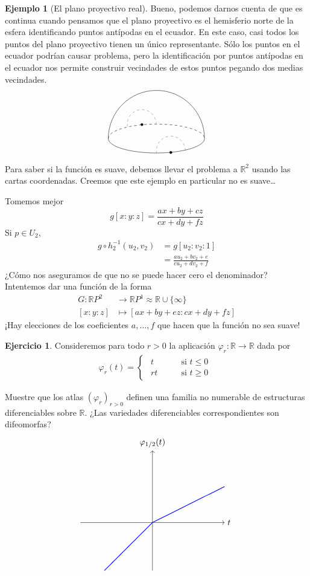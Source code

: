 \documentclass[spanish]{book}
\theoremstyle{definition}
\newtheorem*{ejer*}{Ejercicio}
\newtheorem*{ejem}{Ejemplo}
\newcommand{\R}{\mathbb{R}}
\begin{document}
\begin{ejem}[El plano proyectivo real]
		Bueno, podemos darnos cuenta de que es continua cuando pensamos que el plano proyectivo es el hemisferio norte de la esfera identificando puntos antípodas en el ecuador. En este caso, casi todos los puntos del plano proyectivo tienen un único representante. Sólo los puntos en el ecuador podrían causar problema, pero la identificación por puntos antípodas en el ecuador nos permite construir vecindades de estos puntos pegando dos medias vecindades.
		\[\begin{tikzpicture}[scale=2]
			\draw (-1,0) arc (180:0:1);
			\draw (-1,0) arc (180:360:1 and 0.3);
			\draw[dashed] (-1,0) arc (180:0:1 and 0.3);
			
			\filldraw (-.3,.29) circle (0.025);
			\filldraw (.3,-.29) circle (0.025);
			
			\draw[gray,dashed] (-.6,.25) arc (190:0:0.3);
			\draw[gray,dashed] (.6,-.25) arc (0:190:0.3);
		\end{tikzpicture}\]
		Para saber si la función es suave, debemos llevar el problema a $\R^2$ usando las cartas coordenadas. Creemos que este ejemplo en particular no es suave…
		
		Tomemos mejor
		\[g[x:y:z]=\frac{ax+by+cz}{cx+dy+fz}\]
		Si $p\in U_2$,
		\begin{align*}
			g\circ h_2^{-1}(u_2,v_2)&=g[u_2:v_2:1]\\
			&=\frac{au_2+bv_2+e}{cu_2+dv_2+f}
		\end{align*}
		¿Cómo nos aseguramos de que no se puede hacer cero el denominador? Intentemos dar una función de la forma
		\begin{align*}
			G:\R P^2&\to\R P^1\approx\R\cup\{\infty\}\\
			[x:y:z]&\mapsto[ax+by+ez:cx+dy+fz]
		\end{align*}
		¡Hay elecciones de los coeficientes $a,\ldots,f$ que hacen que la función no sea suave!
	\end{ejem}
	\begin{ejer*}
		Consideremos para todo $r>0$ la aplicación $\varphi_r:\R\to\R$ dada por
		\begin{align*}
			\varphi_r(t)=
			\begin{cases}
				\begin{aligned}
					t\qquad&\text{si }t\leq0\\
					rt\qquad&\text{si }t\geq0
				\end{aligned}
			\end{cases}
		\end{align*}
		
		Muestre que los atlas $(\varphi_r)_{r>0}$ definen una familia no numerable de estructuras diferenciables sobre $\R$. ¿Las variedades diferenciables correspondientes son difeomorfas?
		\[\begin{tikzpicture}
			\draw[->] (-3,0) -- (3,0) node[right] {$t$};
			\draw[->] (0,-2) -- (0,3) node[above] {$\varphi_{1/2}(t)$};
			
			\draw[blue, thick, domain=-2:0] plot (\x, \x);
			\draw[blue, thick, domain=0:3] plot (\x, 0.5*\x);
		\end{tikzpicture}\]
	\end{ejer*}
\end{document}
